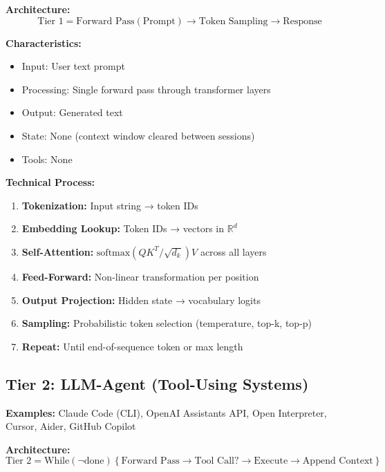 \textbf{Architecture:}
\begin{equation}
\text{Tier 1} = \text{Forward Pass}(\text{Prompt}) \rightarrow \text{Token Sampling} \rightarrow \text{Response}
\end{equation}

\textbf{Characteristics:}
\begin{itemize}[nosep]
    \item Input: User text prompt
    \item Processing: Single forward pass through transformer layers
    \item Output: Generated text
    \item State: None (context window cleared between sessions)
    \item Tools: None
\end{itemize}

\textbf{Technical Process:}
\begin{enumerate}
    \item \textbf{Tokenization:} Input string → token IDs
    \item \textbf{Embedding Lookup:} Token IDs → vectors in $\mathbb{R}^d$
    \item \textbf{Self-Attention:} $\text{softmax}(QK^T/\sqrt{d_k})V$ across all layers
    \item \textbf{Feed-Forward:} Non-linear transformation per position
    \item \textbf{Output Projection:} Hidden state → vocabulary logits
    \item \textbf{Sampling:} Probabilistic token selection (temperature, top-k, top-p)
    \item \textbf{Repeat:} Until end-of-sequence token or max length
\end{enumerate}


\subsection{Tier 2: LLM-Agent (Tool-Using Systems)}

\textbf{Examples:} Claude Code (CLI), OpenAI Assistants API, Open Interpreter, Cursor, Aider, GitHub Copilot

\textbf{Architecture:}
\begin{equation}
\text{Tier 2} = \text{While}(\neg\text{done}) \left\{ \text{Forward Pass} \rightarrow \text{Tool Call?} \rightarrow \text{Execute} \rightarrow \text{Append Context} \right\}
\end{equation}

